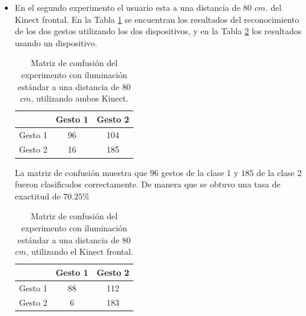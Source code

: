 \begin{itemize}
La matriz de confusión muestra que $127$ gestos de la clase 1 y $194$ de la clase 2 fueron clasificados correctamente. De manera que se obtuvo una tasa de exactitud de $80.25\%$ 

Como se observa en las matrices de confusión, se obtiene una mayor exactitud en el reconocimiento del gesto utilizando dos dispositivos Kinect.


\item En el segundo experimento el usuario esta a una distancia de $80$ $cm.$ del Kinect frontal. En la Tabla \ref{table:80LK2} se encuentran los resultados del reconocimiento de los dos gestos utilizando los dos dispositivos, y en la Tabla \ref{table:80LK1} los resultados usando un dispositivo.   


\begin{table}[h!] 
\begin{center}
\caption{Matriz de confusión del experimento con iluminación estándar a una distancia de $80$ $cm$, utilizando ambos Kinect.} 
\label{table:80LK2}
\begin{tabular}{ r || c | c |} 
        & Gesto 1 & Gesto 2 \\ \hline \hline  
Gesto 1 & 96     &  104     \\ \hline  
Gesto 2 & 16     & 185     \\   
\end{tabular}
\end{center} 
\end{table}

La matriz de confusión muestra que $96$ gestos de la clase 1 y $185$ de la clase 2 fueron clasificados correctamente. De manera que se obtuvo una tasa de exactitud de $70.25\%$  

\begin{table}[h!] 
\begin{center} 
\caption{Matriz de confusión del experimento con iluminación estándar a una distancia de $80$ $cm$, utilizando el Kinect frontal.} 
\label{table:80LK1}
\begin{tabular}{ r || c | c |}  
        & Gesto 1 & Gesto 2 \\ \hline \hline  
Gesto 1 & 88     &  112     \\ \hline  
Gesto 2 & 6     & 183     \\   
\end{tabular}
\end{center} 
\end{table}  


\end{itemize}
